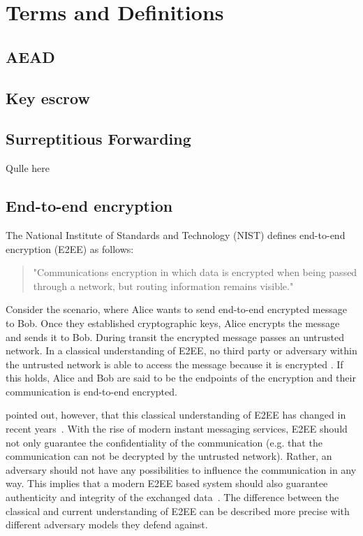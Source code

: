 \documentclass[../main.tex]{subfiles}
\begin{document}
\chapter{Terms and Definitions}
\section{AEAD}

\section{Key escrow}

\section{Surreptitious Forwarding}
Qulle here~\cite{Davis2001}

\section{End-to-end encryption} \label{end-to-end}

The National Institute of Standards and Technology (NIST) defines end-to-end encryption (E2EE) as follows:
\begin{quote}
"Communications encryption in which data is encrypted when being passed through a network, but routing information remains visible."~\cite[88]{Nieles2017}
\end{quote}
Consider the scenario, where Alice wants to send end-to-end encrypted message to Bob.
Once they established cryptographic keys, Alice encrypts the message and sends it to Bob.
During transit the encrypted message passes an untrusted network.
In a classical understanding of E2EE, no third party or adversary within the untrusted network is able to access the message because it is encrypted \cite{Ermoshina2016}.
If this holds, Alice and Bob are said to be the endpoints of the encryption and their communication is end-to-end encrypted.

\citeauthor{Hale2022} pointed out, however, that this classical understanding of E2EE has changed in recent years~\cite{Hale2022}. 
With the rise of modern instant messaging services, E2EE should not only guarantee the confidentiality of the communication (e.g. that the communication can not be decrypted by the untrusted network).
Rather, an adversary should not have any possibilities to influence the communication in any way.
This implies that a modern E2EE based system should also guarantee authenticity and integrity of the exchanged data~\cite{Hale2022}. 
The difference between the classical and current understanding of E2EE can be described more precise with different adversary models they defend against.
\end{document}
